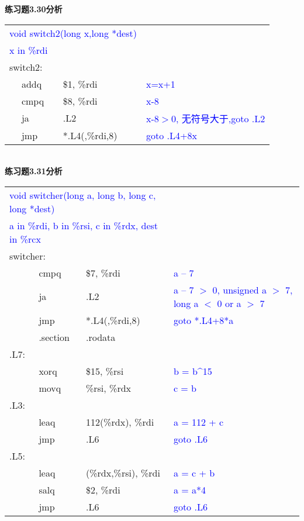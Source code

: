 \documentclass{article}
\newcommand{\blue}[1]{\textcolor{blue}{#1}}
\begin{document}
\begin{CJK}{UTF8}{gbsn}
\newpage
\noindent\textbf{练习题3.30分析}	\\[-4ex]
\begin{table}[ht]
\begin{tabular}{m{2em}m{2em}m{8em}l}
	\multicolumn{3}{l}{\blue{ void switch2(long x,long *dest) }}	\\
	\multicolumn{3}{l}{\blue{x in \%rdi}}	\\
	\multicolumn{3}{l}{switch2:}	\\
	&	addq	&	\$1, \%rdi	&	\blue{ x=x+1 }	\\
	&	cmpq	&	\$8, \%rdi	&	\blue{x-8}	\\
	&	ja	&	.L2		&	\blue{\blue{x-8$>$0, 无符号大于,goto .L2}}	\\
	&	jmp	&	*.L4(,\%rdi,8)	&	\blue{goto .L4+8x}	\\
\end{tabular}
\end{table}	\\[-2ex]
\textbf{练习题3.31分析}	\\[-4ex]
\begin{table}[ht]
\begin{tabular}{m{2em}m{3em}m{8em}l}
	\multicolumn{3}{l}{\blue{void switcher(long a, long b, long c, long *dest)}}	\\
	\multicolumn{3}{l}{\blue{a in \%rdi, b in \%rsi, c in \%rdx, dest in \%rcx}}	\\
	\multicolumn{3}{l}{switcher:}	\\
	&	cmpq		&	\$7, \%rdi	&	\blue{a -- 7}	\\
	&	ja		&	.L2		&	\blue{a -- 7 $>$ 0, unsigned a $>$ 7, long a $<$ 0 or a $>$ 7}	\\
	&	jmp		&	*.L4(,\%rdi,8)	&	\blue{goto *.L4+8*a}	\\
	&	.section	&	.rodata		&	\blue{}	\\
.L7:	&			&			&	\blue{}	\\
&	xorq		&	\$15, \%rsi	&	\blue{b = b\^{}15}	\\
	&	movq		&	\%rsi, \%rdx	&	\blue{c = b}	\\
.L3:	&			&			&	\blue{}	\\
	&	leaq		&	112(\%rdx), \%rdi		&	\blue{a = 112 + c}	\\
	&	jmp		&	.L6		&	\blue{goto .L6}	\\
.L5:	&			&			&	\blue{}	\\
	&	leaq		&	(\%rdx,\%rsi), \%rdi		&	\blue{a = c + b}	\\
	&	salq		&	\$2, \%rdi	&	\blue{a = a*4}	\\
	&	jmp		&	.L6		&	\blue{goto .L6}	\\

\end{tabular}
\end{table}
\end{CJK}
\end{document}
